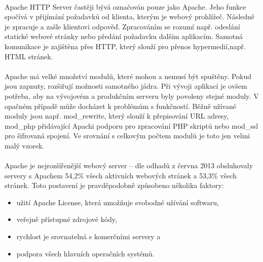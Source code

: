 \documentclass[11pt,a4paper,titlepage,oneside]{book}
\begin{document}

		\paragraph{} Apache HTTP Server častěji bývá označován pouze jako Apache. Jeho funkce spočívá v přijímání požadavků od klienta, kterým je webový prohlížeč. Následně je zpracuje a zašle klientovi odpověď. Zpracováním se rozumí např. odeslání statické webové stránky nebo předání požadavku dalším aplikacím. Samotná komunikace je zajištěna přes \ac{HTTP}, který slouží pro přenos hypermedií\cite{rfc2616},např. \ac{HTML} stránek.
		\paragraph{}Apache má velké množství modulů, které mohou a nemusí být spuštěny. Pokud jsou zapnuty, rozšiřují možnosti samotného jádra. Při vývoji aplikací je ovšem potřeba, aby na vývojovém a produkčním serveru byly povoleny stejné moduly. V opačném případě může docházet k problémům s funkčností. Běžně užívané moduly jsou např. mod\_rewrite, který slouží k přepisování URL adresy, mod\_php přidávající Apachi podporu pro zpracování PHP skriptů nebo mod\_ssl pro šifrovaná spojení. Ve srovnání s celkovým počtem modulů je toto jen velmi malý vzorek.


		\paragraph{}\label{sec:marketShare} Apache je nejrozšířenější webový server -- dle odhadů\cite{netcraft_survey} z června 2013 obsluhovaly servery s Apachem 54,2\% všech aktivních webových stránek a 53,3\% všech stránek. Toto postavení je pravděpodobně způsobeno několika faktory:
		\begin{itemize}
			\item užití Apache License, která umožňuje svobodné užívání softwaru,
			\item veřejně přístupné zdrojové kódy,
			\item rychlost je srovnatelná s komerčními servery a 
			\item podpora všech hlavních operačních systémů.
		\end{itemize}
		
\end{document}
